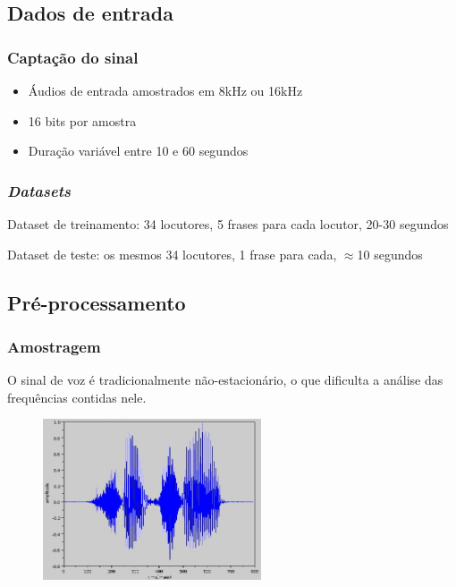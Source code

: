 \documentclass{beamer}
\begin{document}
\subsection{Dados de entrada}

\begin{frame} %
    \frametitle{Captação do sinal}

    \begin{itemize}
        \item Áudios de entrada amostrados em 8kHz ou 16kHz 
        \medskip
        \item 16 bits por amostra
        \medskip
        \item Duração variável entre 10 e 60 segundos
    \end{itemize}

    
\end{frame}

\begin{frame} %
    \frametitle{\emph{Datasets}}

    Dataset de treinamento: 34 locutores, 5 frases para cada locutor, 20-30 segundos

    Dataset de teste: os mesmos 34 locutores, 1 frase para cada, $\approx$10 segundos

\end{frame}

\subsection{Pré-processamento}

\begin{frame} %
    \frametitle{Amostragem}

    O sinal de voz é tradicionalmente não-estacionário, o que dificulta a análise das frequências contidas nele. 

    \begin{figure}[]
        \centering
        \includegraphics[height=135pt]{fig4.png}
        \centering

    \end{figure}
\end{frame}
\end{document}
